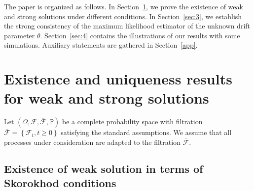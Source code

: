 \documentclass[numbers,compress,v1.0.1]{vmsta}
\theoremstyle{remark}
\newcommand{\F}{\mathcal F}
\renewcommand{\P}{\mathbb P}
\newcommand*{\set}[1]{\left\{#1\right\}}
\begin{document}
The paper is organized as follows. In Section~\ref{sec:2}, we prove
the existence of weak and strong solutions under different conditions. In
Section~\ref{sec:3}, we establish the strong consistency of the
maximum likelihood estimator of the unknown drift parameter
$\theta$. Section~\ref{sec:4} contains the illustrations of our results
with some
simulations. Auxiliary statements are gathered in Section~\ref{app}.

\section{Existence and uniqueness results for weak and strong solutions}
\label{sec:2}

Let $(\varOmega, \F,\overline{\F}, \P)$ be a complete probability
space with filtration $\overline{\F}=\set{\F_t, t\ge0}$
satisfying the standard assumptions. We assume that all
processes under consideration are adapted to the filtration
$\overline{\F}$.

\subsection{Existence of weak solution in terms of Skorokhod conditions}
\end{document}
